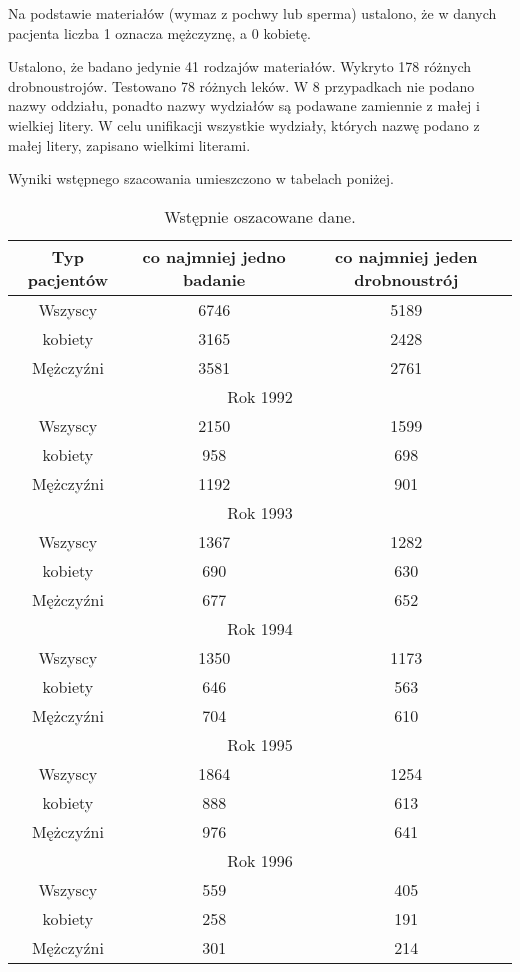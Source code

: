 \documentclass[a4paper,11pt]{article}
\begin{document}
Na podstawie materiałów (wymaz z pochwy lub sperma) ustalono, że w danych pacjenta liczba 1 oznacza mężczyznę, a 0 kobietę.

Ustalono, że badano jedynie 41 rodzajów materiałów. Wykryto 178 różnych drobnoustrojów. Testowano 78 różnych leków. W 8 przypadkach nie podano nazwy oddziału, ponadto nazwy wydziałów są podawane zamiennie z małej i wielkiej litery.
W celu unifikacji wszystkie wydziały, których nazwę podano z małej litery, zapisano wielkimi literami.

Wyniki wstępnego szacowania umieszczono w tabelach poniżej.

\begin{table}[H]
\begin{center}
\caption{Wstępnie oszacowane dane.}
\begin{tabular}{|c|c|c|}
\hline
Typ pacjentów &  co najmniej jedno badanie & co najmniej jeden drobnoustrój \\
\hline
Wszyscy & 6746 &5189\\
kobiety  & 3165  & 2428\\
Mężczyźni & 3581 & 2761\\ \hline
\multicolumn{3}{|c|}{Rok 1992} \\ \hline
Wszyscy & 2150 &1599\\
kobiety  & 958  & 698\\
Mężczyźni & 1192 & 901\\ \hline
\multicolumn{3}{|c|}{Rok 1993} \\ \hline
Wszyscy & 1367 &1282\\
kobiety  & 690  & 630\\
Mężczyźni & 677 & 652\\ \hline
\multicolumn{3}{|c|}{Rok 1994} \\ \hline
Wszyscy & 1350 &1173\\
kobiety  & 646  & 563\\
Mężczyźni & 704 & 610\\ \hline
\multicolumn{3}{|c|}{Rok 1995} \\ \hline
Wszyscy & 1864 &1254\\
kobiety  & 888  & 613\\
Mężczyźni & 976 & 641\\ \hline
\multicolumn{3}{|c|}{Rok 1996} \\ \hline
Wszyscy & 559 &405\\
kobiety  & 258  & 191\\
Mężczyźni & 301 & 214\\ \hline
\hline
\end{tabular}
\end{center}
\end{table}
\end{document}
